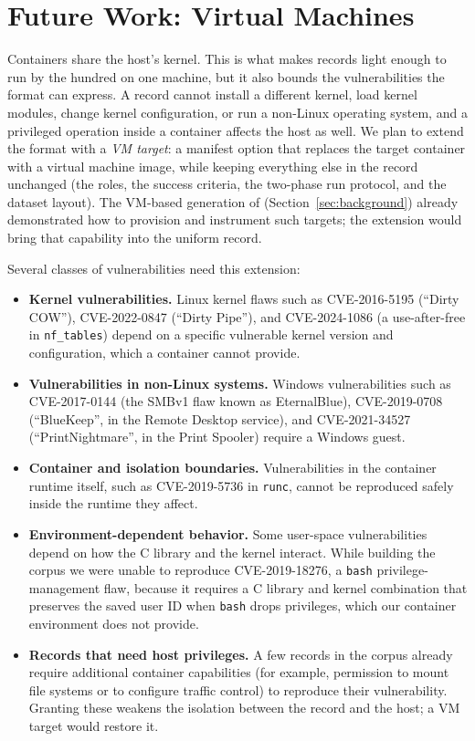 \section{Future Work: Virtual Machines}
\label{sec:future}

Containers share the host's kernel. This is what makes \cvexthree records
light enough to run by the hundred on one machine, but it also bounds the
vulnerabilities the format can express. A record cannot install a different
kernel, load kernel modules, change kernel configuration, or run a non-Linux
operating system, and a privileged operation inside a container affects the
host as well. We plan to extend the format with a \emph{VM target}: a
manifest option that replaces the target container with a virtual machine
image, while keeping everything else in the record unchanged (the roles, the
success criteria, the two-phase run protocol, and the dataset layout). The
VM-based generation of \cvex (Section~\ref{sec:background}) already
demonstrated how to provision and instrument such targets; the extension
would bring that capability into the uniform \cvexthree record.

Several classes of vulnerabilities need this extension:

\begin{itemize}
\item \textbf{Kernel vulnerabilities.} Linux kernel flaws such as
CVE-2016-5195 (``Dirty COW''), CVE-2022-0847 (``Dirty Pipe''), and
CVE-2024-1086 (a use-after-free in \texttt{nf\_tables}) depend on a specific
vulnerable kernel version and configuration, which a container cannot
provide.

\item \textbf{Vulnerabilities in non-Linux systems.} Windows vulnerabilities
such as CVE-2017-0144 (the SMBv1 flaw known as EternalBlue), CVE-2019-0708
(``BlueKeep'', in the Remote Desktop service), and CVE-2021-34527
(``PrintNightmare'', in the Print Spooler) require a Windows guest.

\item \textbf{Container and isolation boundaries.} Vulnerabilities in the
container runtime itself, such as CVE-2019-5736 in \texttt{runc}, cannot be
reproduced safely inside the runtime they affect.

\item \textbf{Environment-dependent behavior.} Some user-space
vulnerabilities depend on how the C library and the kernel interact. While
building the corpus we were unable to reproduce CVE-2019-18276, a
\texttt{bash} privilege-management flaw, because it requires a C library and
kernel combination that preserves the saved user ID when \texttt{bash} drops
privileges, which our container environment does not provide.

\item \textbf{Records that need host privileges.} A few records in the
corpus already require additional container capabilities (for example,
permission to mount file systems or to configure traffic control) to
reproduce their vulnerability. Granting these weakens the isolation between
the record and the host; a VM target would restore it.
\end{itemize}

